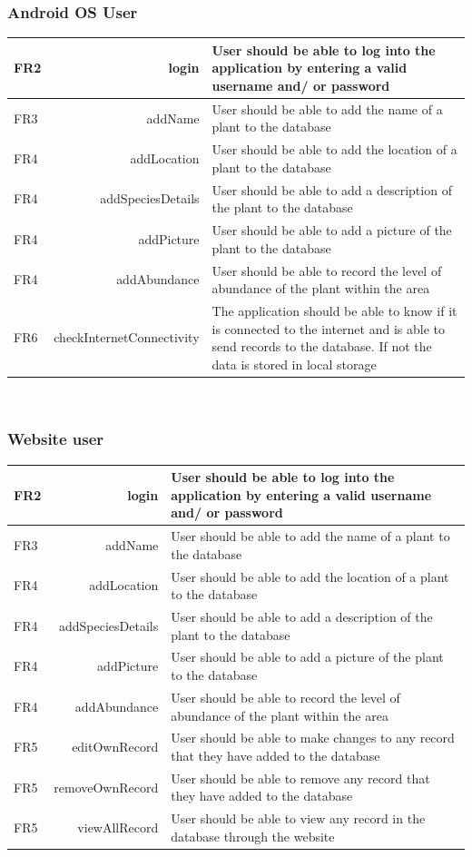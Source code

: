 	\subsubsection{Android OS User}
	\begin{tabular}{| l  r | p{10cm} |}
		\hline
		FR2 & login  & User should be able to log into the application by entering a valid username and/ or password \\ \hline
		FR3 & addName  & User should be able to add the name of a plant to the database \\ \hline
		FR4 & addLocation  & User should be able to add the location of a plant to the database \\ \hline
		FR4 & addSpeciesDetails  & User should be able to add a description of the plant to the database \\ \hline
		FR4 & addPicture  & User should be able to add a picture of the plant to the database \\ \hline
		FR4 & addAbundance & User should be able to record the level of abundance of the plant within the area \\ \hline
		FR6 & checkInternetConnectivity  & The application should be able to know if it is connected to the internet and is able to send records to the database. If not the data is stored in local storage \\ \hline
	\end{tabular} \\

	\subsubsection{Website user}
	\begin{tabular}{| l  r | p{10cm} |}
		\hline
		FR2 & login  & User should be able to log into the application by entering a valid username and/ or password \\ \hline
		FR3 & addName & User should be able to add the name of a plant to the database \\ \hline
		FR4 & addLocation  & User should be able to add the location of a plant to the database \\ \hline
		FR4 & addSpeciesDetails  & User should be able to add a description of the plant to the database \\ \hline
		FR4 & addPicture  & User should be able to add a picture of the plant to the database \\ \hline
		FR4 & addAbundance & User should be able to record the level of abundance of the plant within the area \\ \hline
		FR5 & editOwnRecord  & User should be able to make changes to any record that they have added to the database \\ \hline
		FR5 & removeOwnRecord  & User should be able to remove any record that they have added to the database \\ \hline
		FR5 & viewAllRecord  & User should be able to view any record in the database through the website \\ \hline
	\end{tabular} \\

